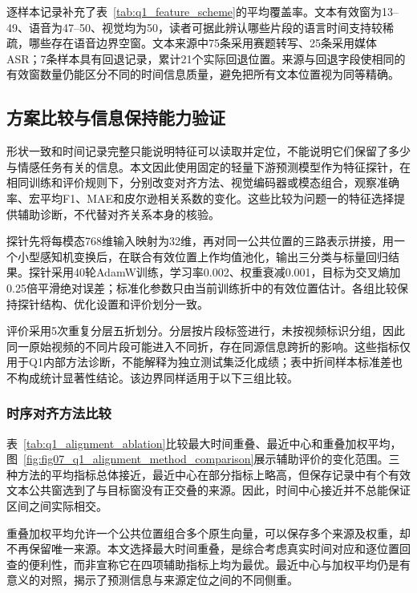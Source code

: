 

逐样本记录补充了表~\ref{tab:q1_feature_scheme}的平均覆盖率。文本有效窗为13--49、语音为47--50、视觉均为50，读者可据此辨认哪些片段的语言时间支持较稀疏，哪些存在语音边界空窗。文本来源中75条采用赛题转写、25条采用媒体ASR；7条样本具有回退记录，累计21个实际回退位置。来源与回退字段使相同的有效窗数量仍能区分不同的时间信息质量，避免把所有文本位置视为同等精确。
\FloatBarrier

\subsection{方案比较与信息保持能力验证}\label{subsec:q1_analysis}
形状一致和时间记录完整只能说明特征可以读取并定位，不能说明它们保留了多少与情感任务有关的信息。本文因此使用固定的轻量下游预测模型作为特征探针，在相同训练和评价规则下，分别改变对齐方法、视觉编码器或模态组合，观察准确率、宏平均F1、MAE和皮尔逊相关系数的变化。这些比较为问题一的特征选择提供辅助诊断，不代替对齐关系本身的核验。

探针先将每模态768维输入映射为32维，再对同一公共位置的三路表示拼接，用一个小型感知机变换后，在联合有效位置上作均值池化，输出三分类与标量回归结果。探针采用40轮AdamW训练，学习率0.002、权重衰减0.001，目标为交叉熵加0.25倍平滑绝对误差；标准化参数只由当前训练折中的有效位置估计。各组比较保持探针结构、优化设置和评价划分一致。

评价采用5次重复分层五折划分。分层按片段标签进行，未按视频标识分组，因此同一原始视频的不同片段可能进入不同折，存在同源信息跨折的影响。这些指标仅用于Q1内部方法诊断，不能解释为独立测试集泛化成绩；表中折间样本标准差也不构成统计显著性结论。该边界同样适用于以下三组比较。

\subsubsection{时序对齐方法比较}\label{subsubsec:q1_align_ablation}
表~\ref{tab:q1_alignment_ablation}比较最大时间重叠、最近中心和重叠加权平均，图~\ref{fig:fig07_q1_alignment_method_comparison}展示辅助评价的变化范围。三种方法的平均指标总体接近，最近中心在部分指标上略高，但保存记录中有\QOneNearestZeroOverlap 个有效文本公共窗选到了与目标窗没有正交叠的来源。因此，时间中心接近并不总能保证区间之间实际相交。



重叠加权平均允许一个公共位置组合多个原生向量，可以保存多个来源及权重，却不再保留唯一来源。本文选择最大时间重叠，是综合考虑真实时间对应和逐位置回查的便利性，而非宣称它在四项辅助指标上均为最优。最近中心与加权平均仍是有意义的对照，揭示了预测信息与来源定位之间的不同侧重。

